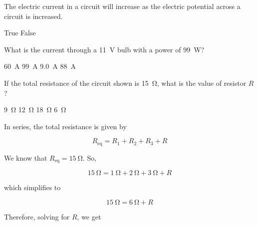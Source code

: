 \documentclass[]{exam}
\begin{document}
\begin{questions}
\question
The electric current in a circuit will increase as the electric potential across a circuit is increased.

\begin{randomizechoices}[norandomize]
    \correctchoice True 
    \choice False
\end{randomizechoices}

\question
What is the current through a \SI{11}{V} bulb with a power of \SI{99}{W}?

\begin{randomizechoices}
    \choice \SI{60}{A}
    \choice \SI{99}{A}
    \correctchoice \SI{9.0}{A}
    \choice \SI{88}{A}
\end{randomizechoices}

\question
If the total resistance of the circuit shown is \SI{15}{\ohm}, what is the value of resistor $R$?

\begin{center}
\end{center}

\begin{randomizechoices}
    \correctchoice \SI{9}{\ohm}
    \choice \SI{12}{\ohm}
    \choice \SI{18}{\ohm}
    \choice \SI{6}{\ohm}
\end{randomizechoices}

\begin{solution}
In series, the total resistance is given by

\begin{equation*}
    R_\mathrm{eq} = R_1 + R_2 + R_3 + R
\end{equation*}

We know that $R_\mathrm{eq} = \SI{15}{\ohm}$. So,

\begin{equation*}
    \SI{15}{\ohm} = \SI{1}{\ohm} + \SI{2}{\ohm} + \SI{3}{\ohm} + R
\end{equation*}

which simplifies to

\begin{equation*}
    \SI{15}{\ohm} = \SI{6}{\ohm} + R
\end{equation*}

Therefore, solving for $R$, we get


\end{solution}
\end{questions}
\end{document}
